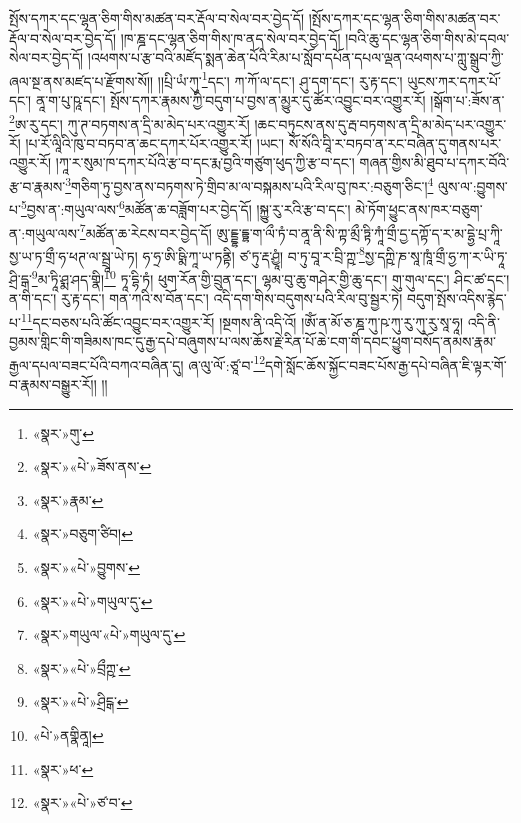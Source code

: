 སྤོས་དཀར་དང་ལྷན་ཅིག་གིས་མཚན་བར་རྡོལ་བ་སེལ་བར་བྱེད་དོ། །སྤོས་དཀར་དང་ལྷན་ཅིག་གིས་མཚན་བར་རྡོལ་བ་སེལ་བར་བྱེད་དོ། །ཁ་ཎྜ་དང་ལྷན་ཅིག་གིས་ཁ་ནད་སེལ་བར་བྱེད་དོ། །བའི་ཆུ་དང་ལྷན་ཅིག་གིས་མེ་དབལ་སེལ་བར་བྱེད་དོ། །འཕགས་པ་རྩ་བའི་མཛོད་སྨན་ཆེན་པོའི་རིམ་པ་སློབ་དཔོན་དཔལ་ལྡན་འཕགས་པ་ཀླུ་སྒྲུབ་ཀྱི་ཞལ་སྔ་ནས་མཛད་པ་རྫོགས་སོ།། །།པྲི་ཡཾ་ཀུ་\footnote{«སྣར་»གུ་}དང་། ཀ་ཀོ་ལ་དང་། ཤུ་དག་དང་། རུ་རྟ་དང་། ཡུངས་ཀར་དཀར་པོ་དང་། ནཱ་ག་པུ་ཥཱ་དང་། སྤོས་དཀར་རྣམས་ཀྱི་བདུག་པ་བྱས་ན་མྱུར་དུ་ཚོར་འབྱུང་བར་འགྱུར་རོ། །སྒོག་པ་:ཟོས་ན་\footnote{«སྣར་»«པེ་»ཟོས་ནས་}ཨ་རུ་དང་། ཀུ་ཊ་བཏགས་ན་དྲི་མ་མེད་པར་འགྱུར་རོ། །ཆང་བཏུངས་ནས་དུ་རྦ་བཏགས་ན་དྲི་མ་མེད་པར་འགྱུར་རོ། །པ་རོ་ལཱིའི་ཁུ་བ་བཏབ་ན་ཆང་དཀར་པོར་འགྱུར་རོ། །ཡང་། སོ་སོའི་བཱི་ར་བཏབ་ན་རང་བཞིན་དུ་གནས་པར་འགྱུར་རོ། །ཀཱ་ར་སུམ་ཁ་དཀར་པོའི་རྩ་བ་དང་རྨ་བྱའི་གཙུག་ཕུད་ཀྱི་རྩ་བ་དང་། གཞན་གྱིས་མི་ཐུབ་པ་དཀར་བོའི་རྩ་བ་རྣམས་\footnote{«སྣར་»རྣམ་}གཅིག་ཏུ་བྱས་ནས་བཏགས་ཏེ་གྲིབ་མ་ལ་བསྐམས་པའི་རིལ་བུ་ཁར་:བཅུག་ཅིང་།\footnote{«སྣར་»བཅུག་ཙིབ།} ལུས་ལ་:བྱུགས་པ་\footnote{«སྣར་»«པེ་»བྱུགས་}བྱས་ན་:གཡུལ་ལས་\footnote{«སྣར་»«པེ་»གཡུལ་དུ་}མཚོན་ཆ་བཟློག་པར་བྱེད་དོ། །སྐྱུ་རུ་རའི་རྩ་བ་དང་། མེ་ཏོག་ཕྱུང་ནས་ཁར་བཅུག་ན་:གཡུལ་ལས་\footnote{«སྣར་»གཡུལ་«པེ་»གཡུལ་དུ་}མཚོན་ཆ་རེངས་བར་བྱེད་དོ། ཨུ་ངྡྷ་དྟྷ་ག་ལྀ་ཏཾ་བ་ནཱ་ནི་སི་ཀྟ་མྲྀ་ཏྟི་ཀཱཾ་གྲྀ་དྱ་དཀྟོ་ད་ར་མ་དྷྱེ་པྲ་ཀཱི་སྱ་ཡ་ཏ་གྲྀ་ཧ་ཕཊ་ལ་སྦྲཱ་ཡེ་ཏ། ཧ་ཧྲ་ཨི་ཥྨི་ཀཱ་ཡ་ཏནྟི། ཙ་ཏུ་རྡ་ཤྱཱཾ། བ་ཏུ་བཱ་ར་བྲི་ཀྵ་\footnote{«སྣར་»«པེ་»བྲྀཀྵ་}སྱ་དཀྵི་ཎ་སཱ་ཁཱཾ་གྲྀ་ཧྱ་ཀ་ར་ཡི་ཏཱ་ཤྲི་དྒ་\footnote{«སྣར་»«པེ་»ཤྲིངྒ་}མ་ཏཱི་ཤྨ་ཤད་གྣི།\footnote{«པེ་»ནགྣིནཱ།} ཏཱ་དྷི་ཏཾ། ཕུག་རོན་གྱི་བྲུན་དང་། ལྷམ་བུ་ཆུ་གཤེར་གྱི་ཆུ་དང་། གུ་གུལ་དང་། ཤིང་ཚ་དང་། ན་གི་དང་། རུ་རྟ་དང་། གན་ཀའི་ས་བོན་དང་། འདི་དག་གིས་བདུགས་པའི་རིལ་བུ་སྦྱར་ཏེ། བདུག་སྤོས་འདིས་རྙེད་པ་\footnote{«སྣར་»ཕ་}དང་བཅས་པའི་ཚོང་འབྱུང་བར་འགྱུར་རོ། །སྔགས་ནི་འདི་འོ། །ཨོཾ་ན་མོ་ཅ་ཎྜ་ཀུ་ཥ་ཀུ་རུ་ཀུ་རུ་སཱ་ཧཱ། འདི་ནི་བྱམས་གླིང་གི་གཟིམས་ཁང་དུ་རྒྱ་དཔེ་བཞུགས་པ་ལས་ཆོས་རྗེ་རིན་པོ་ཆེ་ངག་གི་དབང་ཕྱུག་བསོད་ནམས་རྣམ་རྒྱལ་དཔལ་བཟང་པོའི་བཀའ་བཞིན་དུ། ཞ་ལུ་ལོ་:ཙཱ་བ་\footnote{«སྣར་»«པེ་»ཙ་བ་}དགེ་སློང་ཆོས་སྐྱོང་བཟང་པོས་རྒྱ་དཔེ་བཞིན་ཇི་ལྟར་གོ་བ་རྣམས་བསྒྱུར་རོ།། །།